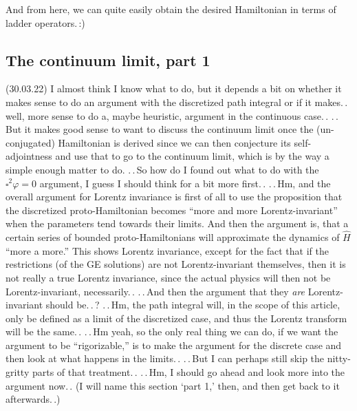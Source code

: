 \documentclass{report}
\begin{document}
And from here, we can quite easily obtain the desired Hamiltonian in terms of ladder operators.\,:) 






\subsection{The continuum limit, part 1}

(30.03.22) I almost think I know what to do, but it depends a bit on whether it makes sense to do an argument with the discretized path integral or if it makes.\,. well, more sense to do a, maybe heuristic, argument in the continuous case.\,. .\,.\,But it makes good sense to want to discuss the continuum limit once the (un-conjugated) Hamiltonian is derived since we can then conjecture its self-adjointness and use that to go to the continuum limit, which is by the way a simple enough matter to do. .\,.\,So how do I found out what to do with the $\square^2\varphi=0$ argument, I guess I should think for a bit more first.\,. .\,.\,Hm, and the overall argument for Lorentz invariance is first of all to use the proposition that the discretized proto-Hamiltonian becomes ``more and more Lorentz-invariant'' when the parameters tend towards their limits. And then the argument is, that a certain series of bounded proto-Hamiltonians will approximate the dynamics of $\hat H$ ``more a more.'' This shows Lorentz invariance, except for the fact that if the restrictions (of the GE solutions) are not Lorentz-invariant themselves, then it is not really a true Lorentz invariance, since the actual physics will then not be Lorentz-invariant, necessarily.\,. .\,.\,And then the argument that they \emph{are} Lorentz-invariant should be.\,.\,? .\,.\,Hm, the path integral will, in the scope of this article, only be defined as a limit of the discretized case, and thus the Lorentz transform will be the same.\,. .\,.\,Hm yeah, so the only real thing we can do, if we want the argument to be ``rigorizable,'' is to make the argument for the discrete case and then look at what happens in the limits.\,. .\,.\,But I can perhaps still skip the nitty-gritty parts of that treatment.\,. .\,.\,Hm, I should go ahead and look more into the argument now.\,. (I will name this section `part 1,' then, and then get back to it afterwards.\,.)
\end{document}

